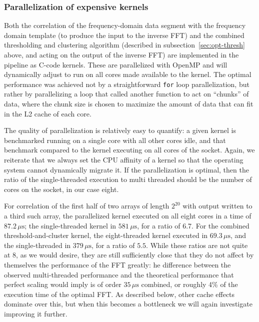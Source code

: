 \vspace*{-10pt}
\subsubsection{Parallelization of expensive kernels}
\vspace*{-05pt}
\label{sec:parall-expens-kern}

Both the correlation of the frequency-domain data segment with the frequency
domain template (to produce the input to the inverse FFT) and the combined
thresholding and clustering algorithm (described in
subsection~\ref{sec:opt-thresh} above, and acting on the output of the inverse
FFT) are implemented in the pipeline as C-code kernels.  These are parallelized
with OpenMP and will dynamically adjust to run on all cores made available to
the kernel. The optimal performance was achieved not by a straightforward
\texttt{for} loop parallelization, but rather by parallelizing a loop that
called another function to act on ``chunks'' of data, where the chunk size is
chosen to maximize the amount of data that can fit in the L2 cache of each
core.

The quality of parallelization is relatively easy to quantify: a given kernel is
benchmarked running on a single core with all other cores idle, and that
benchmark compared to the kernel executing on all cores of the socket. Again, we
reiterate that we always set the CPU affinity of a kernel so that the operating
system cannot dynamically migrate it. If the parallelization is optimal, then
the ratio of the single-threaded execution to multi threaded should be the number
of cores on the socket, in our case eight.

For correlation of the first half of two arrays of length $2^{20}$ with output
written to a third such array, the parallelized kernel executed on all eight
cores in a time of $87.2\,\mu\mathrm{s}$; the single-threaded kernel in
$581\,\mu\mathrm{s}$, for a ratio of 6.7.  For the combined
threshold-and-cluster kernel, the eight-threaded kernel executed in
$69.3\,\mu\mathrm{s}$, and the single-threaded in $379\,\mu\mathrm{s}$, for a
ratio of $5.5$.  While these ratios are not quite at 8, as we would desire, they
are still sufficiently close that they do not affect by themselves the
performance of the FFT greatly: he difference between the observed
multi-threaded performance and the theoretical performance that perfect scaling
would imply is of order $35\,\mu\mathrm{s}$ combined, or roughly 4\% of the
execution time of the optimal FFT. As described below, other cache effects
dominate over this, but when this becomes a bottleneck we will again investigate
improving it further.

